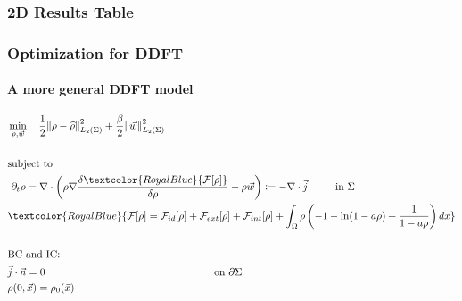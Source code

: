 \documentclass[aspectratio=169,xcolor=dvipsnames]{beamer}
\begin{document}
\appendix
\begin{frame}
	\printbibliography
	
\end{frame}

\begin{frame}
	\frametitle{2D Results Table}
	
\end{frame}

\begin{frame}
	\frametitle{Optimization for DDFT}
	\framesubtitle{A more general DDFT model}
	\begin{align*}
		&\min_{\rho,\vec{w}} \quad \frac{1}{2}\norm{\rho- \widehat{\rho}}_{L_2(\Sigma)}^2 + \frac{\beta}{2} \norm{ {\vec{w}}}_{L_2(\Sigma)}^2\\
		\\
		&\text{subject to:}
		\\
		& \ \partial_t \rho = \nabla \cdot \left( \rho \nabla \frac{\delta \textcolor{RoyalBlue}{ \mathcal F [\rho]} }{\delta \rho} - \rho  {\vec{w}}\right):= - \nabla \cdot \vec j \qquad \ \ { \text{in    } \Sigma}\qquad\qquad\qquad\qquad\\
		&\textcolor{RoyalBlue}{ \mathcal F [\rho]=  \mathcal F_{id}[\rho] + \mathcal F_{ext}[\rho] +  \mathcal F_{int}[\rho] + \int_\Omega \rho \left(-1 -\ln(1 - a\rho) + \frac{1}{1-a\rho}  \right)d \vec x} \\
		\\
		&{\text{BC } \text{and IC:}}\\
		&\vec j \cdot \vec n = 0 \quad \ \qquad \quad \qquad \qquad\qquad\qquad\qquad\qquad \text{on   } \partial \Sigma   \qquad\qquad\qquad\qquad\qquad \qquad \qquad\qquad \qquad \qquad\\
		&{\rho(0,\vec{x}) = \rho_0(\vec{x})} 
	\end{align*}
\end{frame}
\end{document}

